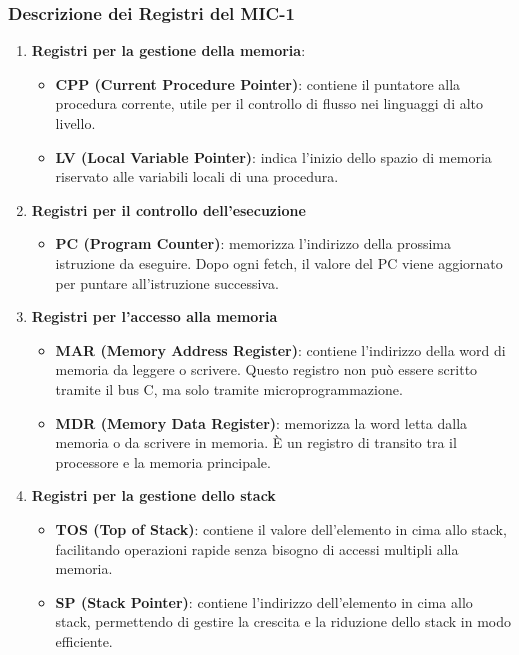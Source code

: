 \subsubsection*{Descrizione dei Registri del MIC-1}

\begin{enumerate}
    \item \textbf{Registri per la gestione della memoria}:
    \begin{itemize}
        \item \textbf{CPP (Current Procedure Pointer)}: contiene il puntatore alla procedura corrente, utile per il controllo di flusso nei linguaggi di alto livello.
        \item \textbf{LV (Local Variable Pointer)}: indica l'inizio dello spazio di memoria riservato alle variabili locali di una procedura.
    \end{itemize}

    \item \textbf{Registri per il controllo dell'esecuzione}
    \begin{itemize}
        \item \textbf{PC (Program Counter)}: memorizza l'indirizzo della prossima istruzione da eseguire. Dopo ogni fetch, il valore del PC viene aggiornato per puntare all'istruzione successiva.
    \end{itemize}

    \item \textbf{Registri per l'accesso alla memoria}
    \begin{itemize}
        \item \textbf{MAR (Memory Address Register)}: contiene l'indirizzo della word di memoria da leggere o scrivere. Questo registro non può essere scritto tramite il bus C, ma solo tramite microprogrammazione.
        \item \textbf{MDR (Memory Data Register)}: memorizza la word letta dalla memoria o da scrivere in memoria. È un registro di transito tra il processore e la memoria principale.
    \end{itemize}

    \item \textbf{Registri per la gestione dello stack}
    \begin{itemize}
        \item \textbf{TOS (Top of Stack)}: contiene il valore dell'elemento in cima allo stack, facilitando operazioni rapide senza bisogno di accessi multipli alla memoria.
        \item \textbf{SP (Stack Pointer)}: contiene l'indirizzo dell'elemento in cima allo stack, permettendo di gestire la crescita e la riduzione dello stack in modo efficiente.
    \end{itemize}


\end{enumerate}
